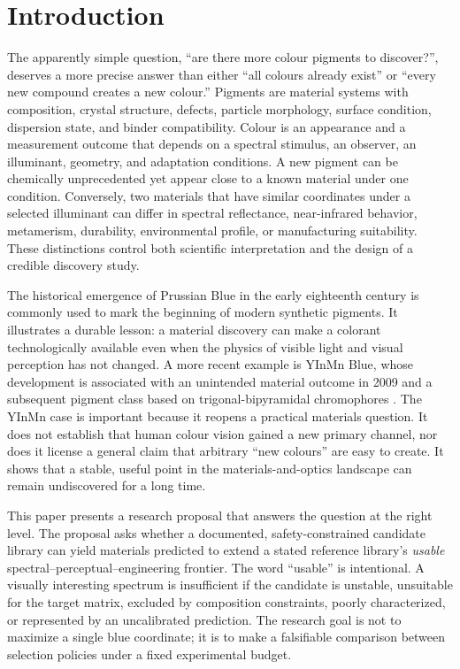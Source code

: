 \documentclass[conference]{IEEEtran}
\begin{document}
\section{Introduction}

The apparently simple question, ``are there more colour pigments to discover?'', deserves a more precise answer than either ``all colours already exist'' or ``every new compound creates a new colour.'' Pigments are material systems with composition, crystal structure, defects, particle morphology, surface condition, dispersion state, and binder compatibility. Colour is an appearance and a measurement outcome that depends on a spectral stimulus, an observer, an illuminant, geometry, and adaptation conditions. A new pigment can be chemically unprecedented yet appear close to a known material under one condition. Conversely, two materials that have similar coordinates under a selected illuminant can differ in spectral reflectance, near-infrared behavior, metamerism, durability, environmental profile, or manufacturing suitability. These distinctions control both scientific interpretation and the design of a credible discovery study.

The historical emergence of Prussian Blue in the early eighteenth century is commonly used to mark the beginning of modern synthetic pigments. It illustrates a durable lesson: a material discovery can make a colorant technologically available even when the physics of visible light and visual perception has not changed. A more recent example is YInMn Blue, whose development is associated with an unintended material outcome in 2009 and a subsequent pigment class based on trigonal-bipyramidal chromophores \cite{yinmn}. The YInMn case is important because it reopens a practical materials question. It does not establish that human colour vision gained a new primary channel, nor does it license a general claim that arbitrary ``new colours'' are easy to create. It shows that a stable, useful point in the materials-and-optics landscape can remain undiscovered for a long time.

This paper presents a research proposal that answers the question at the right level. The proposal asks whether a documented, safety-constrained candidate library can yield materials predicted to extend a stated reference library's \emph{usable} spectral--perceptual--engineering frontier. The word ``usable'' is intentional. A visually interesting spectrum is insufficient if the candidate is unstable, unsuitable for the target matrix, excluded by composition constraints, poorly characterized, or represented by an uncalibrated prediction. The research goal is not to maximize a single blue coordinate; it is to make a falsifiable comparison between selection policies under a fixed experimental budget.
\end{document}

